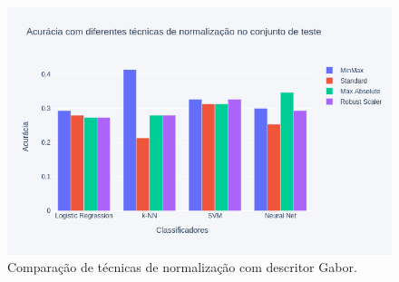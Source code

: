 \begin{figure}[!htbp]
	\centering
	\includegraphics[width=1.0\linewidth,clip=true,trim=0cm 0cm 0cm 0cm, keepaspectratio=true]{bar_norm_all_gabor.png}
	\caption{Comparação de técnicas de normalização com descritor Gabor.}
	\label{fig:bar_norm_all_gabor}
\end{figure}